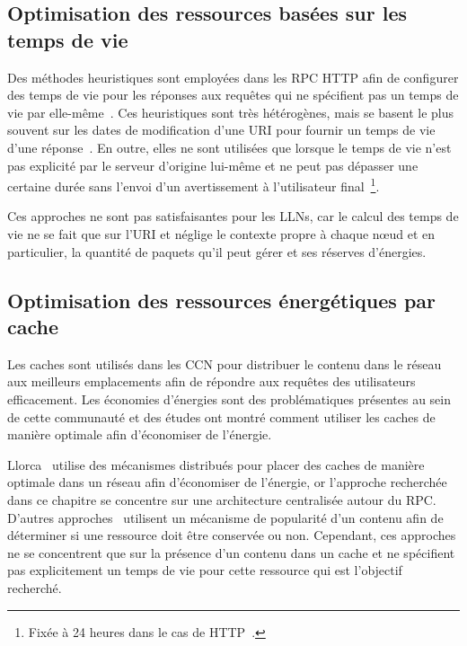 \subsection{Optimisation des ressources basées sur les temps de vie}

Des méthodes heuristiques sont employées dans les \ac{RPC} \ac{HTTP} afin de configurer des temps de vie pour les réponses aux requêtes qui ne spécifient pas un temps de vie par elle-même~\cite{michel1998adaptive}.
Ces heuristiques sont très hétérogènes, mais se basent le plus souvent sur les dates de modification d'une \ac{URI} pour fournir un temps de vie d'une réponse~\cite{gourley2002http}.
En outre, elles ne sont utilisées que lorsque le temps de vie n'est pas explicité par le serveur d'origine lui-même et ne peut pas dépasser une certaine durée sans l'envoi d'un avertissement à l'utilisateur final~\footnote{Fixée à 24 heures dans le cas de \ac{HTTP}~\cite{rfc7234}.}.

Ces approches ne sont pas satisfaisantes pour les \ac{LLN}s, car le calcul des temps de vie ne se fait que sur l'\ac{URI} et néglige le contexte propre à chaque nœud et en particulier, la quantité de paquets qu'il peut gérer et ses réserves d'énergies.

\subsection{Optimisation des ressources énergétiques par cache}

Les caches sont utilisés dans les \ac{CCN} pour distribuer le contenu dans le réseau aux meilleurs emplacements afin de répondre aux requêtes des utilisateurs efficacement.
Les économies d'énergies sont des problématiques présentes au sein de cette communauté et des études ont montré comment utiliser les caches de manière optimale afin d'économiser de l'énergie.

Llorca~\cite{llorca2013dynamic} utilise des mécanismes distribués pour placer des caches de manière optimale dans un réseau afin d'économiser de l'énergie, or l'approche recherchée dans ce chapitre se concentre sur une architecture centralisée autour du \ac{RPC}.
D'autres approches~\cite{li2013energy,choi2012network} utilisent un mécanisme de popularité d'un contenu afin de déterminer si une ressource doit être conservée ou non.
Cependant, ces approches ne se concentrent que sur la présence d'un contenu dans un cache et ne spécifient pas explicitement un temps de vie pour cette ressource qui est l'objectif recherché.


